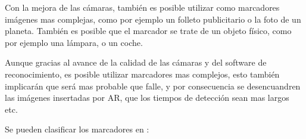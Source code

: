 	\label{marcadorSencillo}
	
	Con la mejora de las cámaras, también es posible utilizar como marcadores imágenes mas complejas, como por ejemplo un folleto publicitario o la foto de un planeta.
	También es posible que el marcador se trate de un objeto físico, como por ejemplo una lámpara, o un coche.
	
	
	Aunque gracias al avance de la calidad de las cámaras y del software de reconocimiento, es posible utilizar marcadores mas complejos, esto también implicarán que será mas probable que falle, y por consecuencia se desencuandren las imágenes insertadas por AR, que los tiempos de detección sean mas largos etc.
	
	Se pueden clasificar los marcadores en \cite{linowes_babilinski_2017}:
	
		
		

